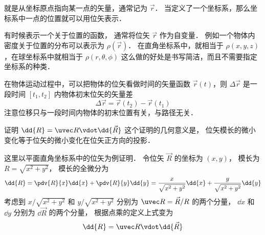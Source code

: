 

就是从坐标原点指向某一点的矢量，通常记为 $\vec r$． 当定义了一个坐标系，那么坐标系中一点的位置就可以用位矢表示．

有时候表示一个关于位置的函数， 通常将位矢 $\vec r$ 作为自变量． 例如一个物体内密度关于位置的分布可以表示为 $\rho(\vec r)$． 在直角坐标系中，就相当于 $\rho(x,y,z)$，在球坐标系中就相当于 $\rho(r,\theta,\phi)$ 这么做的好处是书写简洁，而且不需要指定坐标系的种类．

在物体运动过程中，可以把物体的位矢看做时间的矢量函数 $\vec r(t)$，则 $\Delta \vec r$ 是一段时间 $[t_1,t_2]$ 内物体初末位矢的矢量差
\begin{equation}
\Delta \vec r = \vec r(t_2) - \vec r(t_1)
\end{equation}
注意位移只与一段时间内物体的初末位置有关，与路径无关．

\begin{exam}{证明 $\dd{R} = \uvec R \vdot \dd{\vec R}$}\label{Disp_ex1}
这个证明的几何意义是， 位矢模长的微小变化等于位矢的微小变化在位矢正方向的投影．

这里以平面直角坐标系中的位矢为例证明． 令位矢 $\vec R$ 的坐标为 $(x, y)$， 模长为 $R = \sqrt{x^2 + y^2}$，
模长的全微分为
\begin{equation}
\dd{R} = \pdv{R}{x} \dd{x} + \pdv{R}{y} \dd{y} = \frac{x}{\sqrt{x^2 + y^2}} \dd{x} + \frac{y}{\sqrt{x^2 + y^2}} \dd{y}
\end{equation}
考虑到 $x/\sqrt{x^2 + y^2}$ 和 $y/\sqrt{x^2 + y^2}$ 分别为 $\uvec R = \vec R/R$ 的两个分量， $\dd{x}$ 和 $\dd{y}$ 分别为 $\dd{\vec R}$ 的两个分量， 根据点乘的定义上式变为
\begin{equation}
\dd{R} = \uvec R \vdot \dd{\vec R}
\end{equation}
\end{exam}


